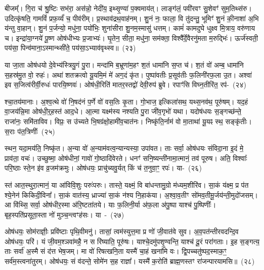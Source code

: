 बीजम्᳚। गि॒रा च॑ श्रु॒ष्टिः सभ॑रा॒ अस॑न्नो॒ नेदी॑य॒ इथ्सृ॒ण्या॑ प॒क्वमाय॑त्। लाङ्ग॑लं॒ पवी॑रवꣳ सु॒शेवꣳ॑ सुम॒तिथ्स॑रु। उदित्कृ॑षति॒ गामविं॑ प्रफ॒र्व्यं॑ च॒ पीव॑रीम्। प्र॒स्थाव॑द्रथ॒वाह॑नम्। शु॒नं नः॒ फाला॒ वि तु॑दन्तु॒ भूमिꣳ॑ शु॒नं की॒नाशा॑ अ॒भि य॑न्तु वा॒हान्। शु॒नं प॒र्जन्यो॒ मधु॑ना॒ पयो॑भिः॒ शुना॑सीरा शु॒नम॒स्मासु॑ धत्तम्। कामं॑ कामदुघे धुक्ष्व मि॒त्राय॒ वरु॑णाय च। इन्द्रा॑या॒ग्नये॑ पू॒ष्ण ओष॑धीभ्यः प्र॒जाभ्यः॑। घृ॒तेन॒ सीता॒ मधु॑ना॒ सम॑क्ता॒ विश्वै᳚र्दे॒वैरनु॑मता म॒रुद्भिः॑। ऊर्ज॑स्वती॒ पय॑सा॒ पिन्व॑माना॒ऽस्मान्थ्सी॑ते॒ पय॑सा॒ऽभ्याव॑वृथ्स्व॥~(२३)\ip

{\anuvakamend[{समो॑कसौ विश्वरूपे वि॒दुर्निर्\mbox{}ऋ॑तिर॒भि च॑ष्ट इ॒ह मि॒त्राय॒ द्वाविꣳ॑शतिश्च}]}

या जा॒ता ओष॑धयो दे॒वेभ्य॑स्त्रियु॒गं पु॒रा। मन्दा॑मि ब॒भ्रूणा॑म॒हꣳ श॒तं धामा॑नि स॒प्त च॑। श॒तं वो॑ अम्ब॒ धामा॑नि स॒हस्र॑मु॒त वो॒ रुहः॑। अथा॑ शतक्रत्वो यू॒यमि॒मं मे॑ अग॒दं कृ॑त। पुष्पा॑वतीः प्र॒सूव॑तीः फ॒लिनी॑\-र\-फ॒ला उ॒त। अश्वा॑ इव स॒जित्व॑रीर्वी॒रुधः॑ पारयि॒ष्णवः॑। ओष॑धी॒\-रिति॑ मातर॒स्तद्वो॑ देवी॒रुप॑ ब्रुवे। रपाꣳ॑सि विघ्न॒तीरि॑त॒ रप॑-~(२४)\ip

श्चा॒तय॑मानाः। अ॒श्व॒त्थे वो॑ नि॒षद॑नं प॒र्णे वो॑ वस॒तिः कृ॒ता। गो॒भाज॒ इत्किला॑सथ॒ यथ्स॒नव॑थ॒ पूरु॑षम्। यद॒हं वा॒जय॑न्नि॒मा ओष॑धी॒र्॒\mbox{}हस्त॑ आद॒धे। आ॒त्मा यक्ष्म॑स्य नश्यति पु॒रा जी॑व॒गृभो॑ यथा। यदोष॑धयः स॒ङ्गच्छ॑न्ते॒ राजा॑नः॒ समि॑ताविव। विप्रः॒ स उ॑च्यते भि॒षग्र॑क्षो॒हामी॑व॒चात॑नः। निष्कृ॑ति॒र्नाम॑ वो मा॒ताथा॑ यू॒यꣴ स्थ॒ सङ्कृ॑तीः। स॒राः प॑त॒त्रिणीः᳚~(२५)\ip

स्थन॒ यदा॒मय॑ति॒ निष्कृ॑त। अ॒न्या वो॑ अ॒न्याम॑वत्व॒न्यान्यस्या॒ उपा॑वत। ताः सर्वा॒ ओष॑धयः संविदा॒ना इ॒दं मे॒ प्राव॑ता॒ वचः॑। उच्छुष्मा॒ ओष॑धीनां॒ गावो॑ गो॒ष्ठादि॑वेरते। धनꣳ॑ सनि॒ष्यन्ती॑नामा॒त्मानं॒ तव॑ पूरुष। अति॒ विश्वाः᳚ परि॒ष्ठाः स्ते॒न इ॑व व्र॒जम॑क्रमुः। ओष॑धयः॒ प्राचु॑च्यवु॒र्यत् किं च॑ त॒नुवा॒ꣳ॒ रपः॑। या-~(२६)\ip

स्त॑ आत॒स्थुरा॒त्मानं॒ या आ॑विवि॒शुः परुः॑परुः। तास्ते॒ यक्ष्मं॒ वि बा॑धन्तामु॒ग्रो म॑ध्यम॒शीरि॑व। सा॒कं य॑क्ष्म॒ प्र प॑त श्ये॒नेन॑ किकिदी॒विना᳚। सा॒कं वात॑स्य॒ ध्राज्या॑ सा॒कं न॑श्य नि॒हाक॑या। अ॒श्वा॒व॒तीꣳ सो॑मव॒तीमू॒र्जय॑न्ती॒\-मुदो॑जसम्। आ वि॑थ्सि॒ सर्वा॒ ओष॑धीर॒स्मा अ॑रि॒ष्टता॑तये। याः फ॒लिनी॒र्या अ॑फ॒ला अ॑पु॒ष्पा याश्च॑ पु॒ष्पिणीः᳚। बृह॒स्पति॑प्रसूता॒स्ता नो॑ मुञ्च॒न्त्वꣳह॑सः। या~-~(२७)\ip

ओष॑धयः॒ सोम॑राज्ञीः॒ प्रवि॑ष्टाः पृथि॒वीमनु॑। तासां॒ त्वम॑स्युत्त॒मा प्र णो॑ जी॒वात॑वे सुव। अ॒व॒पत॑न्तीरवदन्दि॒व ओष॑धयः॒ परि॑। यं जी॒वम॒श्ञवा॑महै॒ न स रि॑ष्याति॒ पूरु॑षः। याश्चे॒दमु॑पशृ॒ण्वन्ति॒ याश्च॑ दू॒रं परा॑गताः। इ॒ह स॒ङ्गत्य॒ ताः सर्वा॑ अ॒स्मै सं द॑त्त भेष॒जम्। मा वो॑ रिषत्खनि॒ता यस्मै॑ चा॒हं खना॑मि वः। द्वि॒पच्चतु॑ष्पद॒स्माक॒ꣳ॒ सर्व॑म॒स्त्वना॑तुरम्। ओष॑धयः॒ सं व॑दन्ते॒ सोमे॑न स॒ह राज्ञा᳚। यस्मै॑ क॒रोति॑ ब्राह्म॒णस्तꣳ रा॑जन्पारयामसि॥~(२८)\ip

